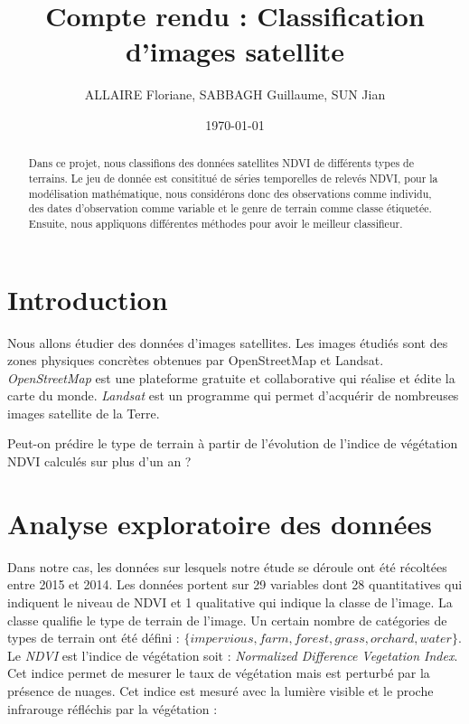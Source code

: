 \documentclass[twocolumn,10pt]{article}
\title{Compte rendu : Classification d'images satellite}
\author{ALLAIRE Floriane, SABBAGH Guillaume, SUN Jian }
\date{\today}
\begin{document}
\maketitle %
\thispagestyle{fancy} %

\begin{abstract}

Dans ce projet, nous classifions des données satellites NDVI de différents types de terrains. Le jeu de donnée est consititué de séries temporelles de relevés NDVI, pour la modélisation mathématique, nous considérons donc des observations comme individu, des dates d'observation comme variable et le genre de terrain comme classe étiquetée. Ensuite, nous appliquons différentes méthodes pour avoir le meilleur classifieur.

\end{abstract}



\section{Introduction}

Nous allons étudier des données d'images satellites. Les images étudiés sont des zones physiques concrètes obtenues par OpenStreetMap et Landsat. \textit{OpenStreetMap} est une plateforme gratuite et collaborative qui réalise et édite la carte du monde. \textit{Landsat} est un programme qui permet d'acquérir de nombreuses images satellite de la Terre. 

Peut-on prédire le type de terrain à partir de l'évolution de l'indice de végétation NDVI calculés sur plus d'un an ?


\section{Analyse exploratoire des données }\label{Analyse_explorratoire}
Dans notre cas, les données sur lesquels notre étude se déroule ont été récoltées entre 2015 et 2014. Les données portent sur 29 variables dont 28 quantitatives qui indiquent le niveau de NDVI et 1 qualitative qui indique la classe de l'image. 
La classe qualifie le type de terrain de l'image. Un certain nombre de catégories de types de terrain ont été défini : $\{impervious,farm,forest,grass,orchard,water\}$. Le \textit{NDVI} est l'indice de végétation soit : \textit{Normalized Difference Vegetation Index}. Cet indice permet de mesurer le taux de végétation mais est perturbé par la présence de nuages. Cet indice est mesuré avec la lumière visible et le proche infrarouge réfléchis par la végétation : 
\end{document}
